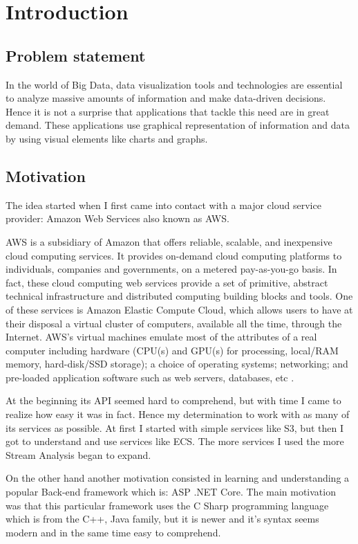 \chapter{Introduction}
\label{chap:01}

\section{Problem statement}
\label{chap:01:01}
In the world of Big Data, data visualization tools and technologies are essential to analyze massive amounts of information and make data-driven decisions. Hence it is not a surprise that applications that tackle this need are in great demand. These applications use graphical representation of information and data by using visual elements like charts and graphs.\\

\section{Motivation}
\label{chap:01:02}
The idea started when I first came into contact with a major cloud service provider: Amazon Web Services also known as AWS.

AWS is a subsidiary of Amazon that offers reliable, scalable, and inexpensive cloud computing services. It provides on-demand cloud computing platforms to individuals, companies and governments, on a metered pay-as-you-go basis. In fact, these cloud computing web services provide a set of primitive, abstract technical infrastructure and distributed computing building blocks and tools. One of these services is Amazon Elastic Compute Cloud, which allows users to have at their disposal a virtual cluster of computers, available all the time, through the Internet. AWS's virtual machines emulate most of the attributes of a real computer including hardware (CPU(s) and GPU(s) for processing, local/RAM memory, hard-disk/SSD storage); a choice of operating systems; networking; and pre-loaded application software such as web servers, databases, etc \cite{aws-overview}.

At the beginning its API seemed hard to comprehend, but with time I came to realize how easy it was in fact. Hence my determination to work with as many of its services as possible. At first I started with simple services like S3, but then I got to understand and use services like ECS. The more services I used the more Stream Analysis began to expand.

On the other hand another motivation consisted in learning and understanding a popular Back-end framework which is: ASP .NET Core. The main motivation was that this particular framework uses the C Sharp programming language which is from the C++, Java family, but it is newer and it's syntax seems modern and in the same time easy to comprehend.

